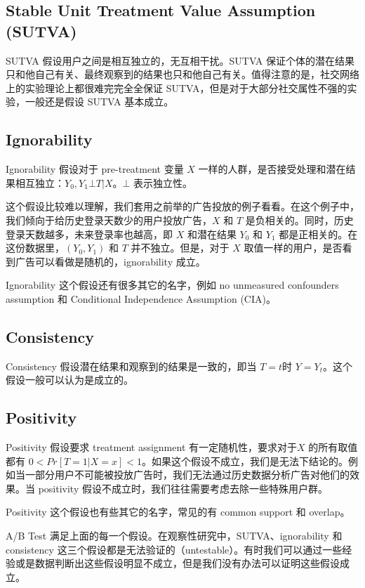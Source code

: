\documentclass[12pt]{article}
\begin{document}
\subsection{Stable Unit Treatment Value Assumption (SUTVA)}
SUTVA 假设用户之间是相互独立的，无互相干扰。SUTVA 保证个体的潜在结果只和他自己有关、最终观察到的结果也只和他自己有关。值得注意的是，社交网络上的实验理论上都很难完完全全保证 SUTVA，但是对于大部分社交属性不强的实验，一般还是假设 SUTVA 基本成立。

\subsection{Ignorability}
Ignorability 假设对于 pre-treatment 变量 $X$ 一样的人群，是否接受处理和潜在结果相互独立：$Y_0, Y_1 \bot T|X$。$\bot$ 表示独立性。

这个假设比较难以理解，我们套用之前举的广告投放的例子看看。在这个例子中，我们倾向于给历史登录天数少的用户投放广告，$X$ 和 $T$ 是负相关的。同时，历史登录天数越多，未来登录率也越高，即 $X$ 和潜在结果 $Y_0$ 和 $Y_1$ 都是正相关的。在这份数据里，$(Y_0, Y_1)$ 和 $T$ 并不独立。但是，对于 $X$ 取值一样的用户，是否看到广告可以看做是随机的，ignorability 成立。

Ignorability 这个假设还有很多其它的名字，例如 no unmeasured confounders assumption 和 Conditional Independence Assumption (CIA)。

\subsection{Consistency}
Consistency 假设潜在结果和观察到的结果是一致的，即当 $T = t$时 $Y = Y_t$。这个假设一般可以认为是成立的。

\subsection{Positivity}
Positivity 假设要求 treatment assignment 有一定随机性，要求对于$X$ 的所有取值都有 $ 0 < Pr[T=1|X=x] < 1$。如果这个假设不成立，我们是无法下结论的。例如当一部分用户不可能被投放广告时，我们无法通过历史数据分析广告对他们的效果。当 positivity 假设不成立时，我们往往需要考虑去除一些特殊用户群。

Positivity 这个假设也有些其它的名字，常见的有 common support 和 overlap。

A/B Test 满足上面的每一个假设。在观察性研究中，SUTVA、ignorability 和 consistency 这三个假设都是无法验证的（untestable）。有时我们可以通过一些经验或是数据判断出这些假设明显不成立，但是我们没有办法可以证明这些假设成立。
\end{document}
